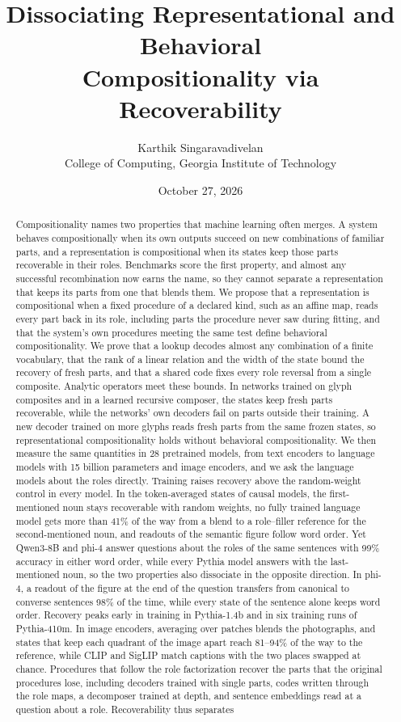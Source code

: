 \documentclass[10pt]{article}
\title{Dissociating Representational and Behavioral\\ Compositionality via Recoverability}
\author{Karthik Singaravadivelan\\ College of Computing, Georgia Institute of Technology}
\date{October 27, 2026}
\theoremstyle{plain}
\theoremstyle{remark}
\begin{document}
\maketitle

\begin{abstract}
Compositionality names two properties that machine learning often merges. A system behaves compositionally when its own outputs succeed on new combinations of familiar parts, and a representation is compositional when its states keep those parts recoverable in their roles. Benchmarks score the first property, and almost any successful recombination now earns the name, so they cannot separate a representation that keeps its parts from one that blends them. We propose that a representation is compositional when a fixed procedure of a declared kind, such as an affine map, reads every part back in its role, including parts the procedure never saw during fitting, and that the system's own procedures meeting the same test define behavioral compositionality. We prove that a lookup decodes almost any combination of a finite vocabulary, that the rank of a linear relation and the width of the state bound the recovery of fresh parts, and that a shared code fixes every role reversal from a single composite. Analytic operators meet these bounds. In networks trained on glyph composites and in a learned recursive composer, the states keep fresh parts recoverable, while the networks' own decoders fail on parts outside their training. A new decoder trained on more glyphs reads fresh parts from the same frozen states, so representational compositionality holds without behavioral compositionality. We then measure the same quantities in 28 pretrained models, from text encoders to language models with 15 billion parameters and image encoders, and we ask the language models about the roles directly. Training raises recovery above the random-weight control in every model. In the token-averaged states of causal models, the first-mentioned noun stays recoverable with random weights, no fully trained language model gets more than 41\% of the way from a blend to a role--filler reference for the second-mentioned noun, and readouts of the semantic figure follow word order. Yet Qwen3-8B and phi-4 answer questions about the roles of the same sentences with 99\% accuracy in either word order, while every Pythia model answers with the last-mentioned noun, so the two properties also dissociate in the opposite direction. In phi-4, a readout of the figure at the end of the question transfers from canonical to converse sentences 98\% of the time, while every state of the sentence alone keeps word order. Recovery peaks early in training in Pythia-1.4b and in six training runs of Pythia-410m. In image encoders, averaging over patches blends the photographs, and states that keep each quadrant of the image apart reach 81--94\% of the way to the reference, while CLIP and SigLIP match captions with the two places swapped at chance. Procedures that follow the role factorization recover the parts that the original procedures lose, including decoders trained with single parts, codes written through the role maps, a decomposer trained at depth, and sentence embeddings read at a question about a role. Recoverability thus separates 
\end{abstract}
\end{document}
